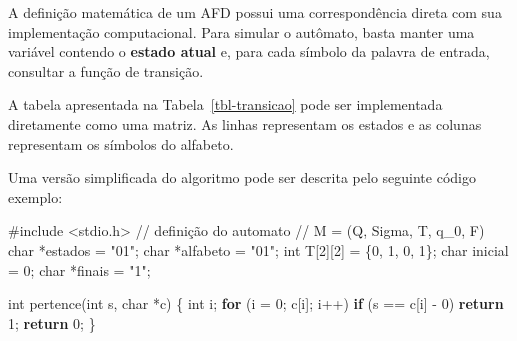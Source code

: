 \documentclass[
  brazilian,
  letterpaper,
]{book}
\newenvironment{Shaded}{\begin{snugshade}}{\end{snugshade}}
\newcommand{\CharTok}[1]{\textcolor[rgb]{0.13,0.47,0.30}{#1}}
\newcommand{\CommentTok}[1]{\textcolor[rgb]{0.37,0.37,0.37}{#1}}
\newcommand{\ControlFlowTok}[1]{\textcolor[rgb]{0.00,0.23,0.31}{\textbf{#1}}}
\newcommand{\DataTypeTok}[1]{\textcolor[rgb]{0.68,0.00,0.00}{#1}}
\newcommand{\DecValTok}[1]{\textcolor[rgb]{0.68,0.00,0.00}{#1}}
\newcommand{\ImportTok}[1]{\textcolor[rgb]{0.00,0.46,0.62}{#1}}
\newcommand{\NormalTok}[1]{\textcolor[rgb]{0.00,0.23,0.31}{#1}}
\newcommand{\OperatorTok}[1]{\textcolor[rgb]{0.37,0.37,0.37}{#1}}
\newcommand{\PreprocessorTok}[1]{\textcolor[rgb]{0.68,0.00,0.00}{#1}}
\newcommand{\StringTok}[1]{\textcolor[rgb]{0.13,0.47,0.30}{#1}}
\theoremstyle{plain}
\theoremstyle{definition}
\theoremstyle{remark}
\begin{document}
A definição matemática de um AFD possui uma correspondência direta com
sua implementação computacional. Para simular o autômato, basta manter
uma variável contendo o \textbf{estado atual} e, para cada símbolo da
palavra de entrada, consultar a função de transição.

A tabela apresentada na Tabela~\ref{tbl-transicao} pode ser implementada
diretamente como uma matriz. As linhas representam os estados e as
colunas representam os símbolos do alfabeto.

Uma versão simplificada do algoritmo pode ser descrita pelo seguinte
código exemplo:

\begin{Shaded}
\begin{Highlighting}[]
\PreprocessorTok{\#include }\ImportTok{\textless{}stdio.h\textgreater{}}
\CommentTok{// definição do automato}
\CommentTok{// M = (Q, Sigma, T, q\_0, F)}
\DataTypeTok{char} \OperatorTok{*}\NormalTok{estados }\OperatorTok{=} \StringTok{"01"}\OperatorTok{;}
\DataTypeTok{char} \OperatorTok{*}\NormalTok{alfabeto }\OperatorTok{=} \StringTok{"01"}\OperatorTok{;}
\DataTypeTok{int}\NormalTok{ T}\OperatorTok{[}\DecValTok{2}\OperatorTok{][}\DecValTok{2}\OperatorTok{]} \OperatorTok{=} \OperatorTok{\{}\DecValTok{0}\OperatorTok{,} \DecValTok{1}\OperatorTok{,}
               \DecValTok{0}\OperatorTok{,} \DecValTok{1}\OperatorTok{\};}
\DataTypeTok{char}\NormalTok{ inicial }\OperatorTok{=} \DecValTok{0}\OperatorTok{;}
\DataTypeTok{char} \OperatorTok{*}\NormalTok{finais }\OperatorTok{=} \StringTok{"1"}\OperatorTok{;}

\DataTypeTok{int}\NormalTok{ pertence}\OperatorTok{(}\DataTypeTok{int}\NormalTok{ s}\OperatorTok{,} \DataTypeTok{char} \OperatorTok{*}\NormalTok{c}\OperatorTok{)}
\OperatorTok{\{}
    \DataTypeTok{int}\NormalTok{ i}\OperatorTok{;}
    \ControlFlowTok{for} \OperatorTok{(}\NormalTok{i }\OperatorTok{=} \DecValTok{0}\OperatorTok{;}\NormalTok{ c}\OperatorTok{[}\NormalTok{i}\OperatorTok{];}\NormalTok{ i}\OperatorTok{++)}
        \ControlFlowTok{if} \OperatorTok{(}\NormalTok{s }\OperatorTok{==}\NormalTok{ c}\OperatorTok{[}\NormalTok{i}\OperatorTok{]} \OperatorTok{{-}} \CharTok{\textquotesingle{}0\textquotesingle{}}\OperatorTok{)}
            \ControlFlowTok{return} \DecValTok{1}\OperatorTok{;}
    \ControlFlowTok{return} \DecValTok{0}\OperatorTok{;}
\OperatorTok{\}}


\end{Highlighting}
\end{Shaded}
\end{document}
